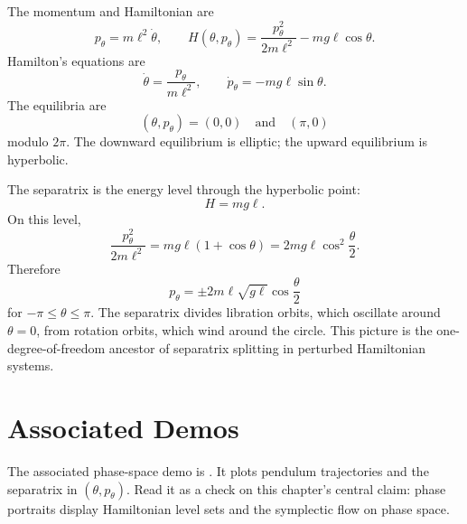 The momentum and Hamiltonian are
\[
  p_\theta=m\ell^2\dot\theta,
  \qquad
  H(\theta,p_\theta)
  =
  \frac{p_\theta^2}{2m\ell^2}-mg\ell\cos\theta.
\]
Hamilton's equations are
\[
  \dot\theta=\frac{p_\theta}{m\ell^2},
  \qquad
  \dot p_\theta=-mg\ell\sin\theta.
\]
The equilibria are
\[
  (\theta,p_\theta)=(0,0)
  \quad\text{and}\quad
  (\pi,0)
\]
modulo \(2\pi\). The downward equilibrium is elliptic; the upward equilibrium
is hyperbolic.

The separatrix is the energy level through the hyperbolic point:
\[
  H=mg\ell.
\]
On this level,
\[
  \frac{p_\theta^2}{2m\ell^2}
  =
  mg\ell(1+\cos\theta)
  =
  2mg\ell\cos^2\frac{\theta}{2}.
\]
Therefore
\[
  p_\theta
  =
  \pm2m\ell\sqrt{g\ell}\cos\frac{\theta}{2}
\]
for \(-\pi\leq\theta\leq\pi\). The separatrix divides libration orbits, which
oscillate around \(\theta=0\), from rotation orbits, which wind around the
circle. This picture is the one-degree-of-freedom ancestor of separatrix
splitting in perturbed Hamiltonian systems.

\section{Associated Demos}
\label{sec:hamiltonian-associated-demos}

The associated phase-space demo is
.
It plots pendulum trajectories and the separatrix in \((\theta,p_\theta)\).
Read it as a check on this chapter's central claim: phase portraits display
Hamiltonian level sets and the symplectic flow on phase space.

